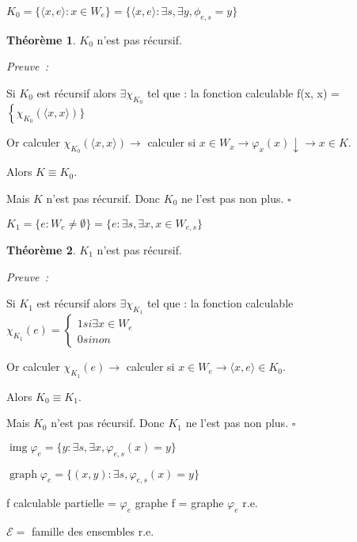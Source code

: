 \documentclass{book}
\theoremstyle{definition}
\newtheorem{theorem}{Théorème}
\numberwithin{lemma}{subsection}
\numberwithin{theorem}{subsection}
\numberwithin{definition}{subsection}
\numberwithin{proposition}{subsection}
\numberwithin{corollary}{subsection}
\numberwithin{property}{subsection}
\numberwithin{example}{subsection}
\numberwithin{heuristique}{subsection}
\numberwithin{scenario}{subsection}
\newenvironment{proofi} {\noindent\emph{Preuve~:}} {\hfill $\square$\vspace{0.2cm}}
\newcommand{\Pairing}[1]{\langle #1 \rangle}
\DeclareMathOperator{\img}{img}
\DeclareMathOperator{\graph}{graph}
\begin{document}
$K_0 = \{\Pairing{x,e}:x \in W_e\} = \{\Pairing{x,e} : \exists s, \exists y, \phi_{e,s} = y\}$

\begin{theorem}
$K_0$ n'est pas récursif.
\end{theorem}

\begin{proofi}
\par Si $K_0$ est récursif alors $\exists \chi_{K_0} $ tel que :
la fonction calculable f(x, x) = $\left\{ \chi_{K_0}(\Pairing{x, x})
\}\right.$
\par Or calculer $\chi_{K_0}(\Pairing{x, x}) \rightarrow$ calculer si $ x \in W_x \rightarrow \varphi_x(x) \downarrow \rightarrow x \in K$.
\par Alors $K \equiv K_0$.
\par Mais $K$ n'est pas récursif. Donc $K_0$ ne l'est pas non plus.
\end{proofi}

\par $K_1 = \{e : W_e \not= \emptyset\} = \{e : \exists s, \exists x, x \in W_{e,s}\}$

\begin{theorem}
$K_1$ n'est pas récursif.
\end{theorem}

\begin{proofi}
\par Si $K_1$ est récursif alors $\exists \chi_{K_1} $ tel que :
la fonction calculable $\chi_{K_1}(e) = \left\{ \begin{array}{cc}
    1 si \exists x \in W_e\\
    0 sinon
\end{array}
 \right.$
\par Or calculer $\chi_{K_1}(e) \rightarrow$ calculer si $x \in W_e \rightarrow \Pairing{x, e} \in K_0$.
\par Alors $K_0 \equiv K_1$.
\par Mais $K_0$ n'est pas récursif. Donc $K_1$ ne l'est pas non plus.
\end{proofi}

\par $\img{\varphi_e} = \{y : \exists s, \exists x, \varphi_{e,s}(x) = y\}$
\par $\graph{\varphi_e} = \{(x,y) : \exists s, \varphi_{e,s}(x) = y\}$

\par f calculable partielle = $\varphi_e$ graphe f = graphe $\varphi_e$ r.e.
\par $\mathcal{E} = $ famille des ensembles r.e.
\end{document}
